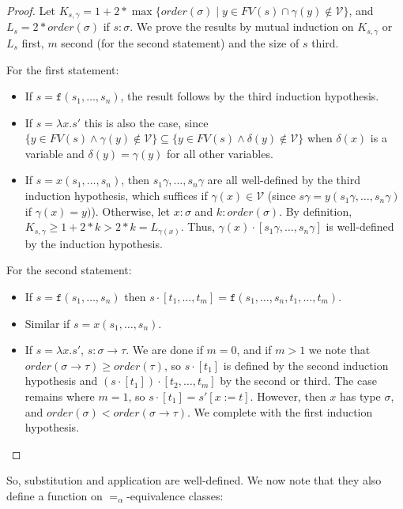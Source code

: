 \documentclass{lmcs}
\theoremstyle{theorem}\newtheorem{theorem}{Theorem}
\theoremstyle{theorem}\newtheorem{lemma}[theorem]{Lemma}
\theoremstyle{theorem}\newtheorem{corollary}[theorem]{Corollary}
\theoremstyle{definition}\newtheorem{definition}[theorem]{Definition}
\theoremstyle{definition}\newtheorem{example}[theorem]{Example}
\newcommand{\V}{\mathcal{V}}
\newcommand{\FV}{\mathit{FV}}
\newcommand{\order}{\mathit{order}}
\newcommand{\atype}{\sigma}
\newcommand{\btype}{\tau}
\newcommand{\identifier}[1]{\mathtt{#1}}
\newcommand{\afun}{\identifier{f}}
\newcommand{\avar}{x}
\newcommand{\bvar}{y}
\newcommand{\abs}[2]{\lambda #1.#2}
\newcommand{\arrtype}{\rightarrow}
\begin{document}
\begin{proof}
Let $K_{s,\gamma} = 1 + 2 * \max\{ \order(\atype) \mid \bvar \in \FV(s) \cap \gamma(\bvar) \notin
\V \}$, and $L_s = 2 * \order(\atype)$ if $s : \atype$.  We prove the results by mutual induction
on $K_{s,\gamma}$ or $L_s$ first, $m$ second (for the second statement) and the size of $s$ third.

For the first statement:
\begin{itemize}
\item If $s = \afun(s_1,\dots,s_n)$, the result follows by the third induction hypothesis.
\item If $s = \abs{\avar}{s'}$ this is also the case, since $\{ \bvar \in \FV(s) \wedge
  \gamma(\bvar) \notin \V \} \subseteq \{ \bvar \in \FV(s) \wedge \delta(\bvar) \notin \V
  \}$ when $\delta(\avar)$ is a variable and $\delta(\bvar) = \gamma(\bvar)$ for all other
  variables.
\item If $s = \avar(s_1,\dots,s_n)$, then $s_1\gamma,\dots,s_n\gamma$ are all well-defined by
  the third induction hypothesis, which suffices if $\gamma(\avar) \in \V$ (since
  $s\gamma = \bvar(s_1\gamma,\dots,s_n\gamma)$ if $\gamma(\avar) = \bvar)$).
  Otherwise, let $\avar : \atype$ and $k : \order(\atype)$.  By definition, $K_{s,\gamma} \geq 1 +
  2 * k > 2 * k = L_{\gamma(\avar)}$.  Thus, $\gamma(\avar) \cdot [s_1\gamma,\dots,s_n\gamma]$
  is well-defined by the induction hypothesis.
\end{itemize}
For the second statement:
\begin{itemize}
\item If $s = \afun(s_1,\dots,s_n)$ then $s \cdot [t_1,\dots,t_m] = \afun(s_1,\dots,s_n,t_1,\dots,
  t_m)$.
\item Similar if $s = \avar(s_1,\dots,s_n)$.
\item If $s = \abs{\avar}{s'}$, $s : \atype \arrtype \btype$. We are done if $m = 0$, and if
  $m > 1$ we note that $\order(\atype \arrtype \btype) \geq \order(\btype)$, so $s \cdot [t_1]$ is
  defined by the second induction hypothesis and $(s \cdot [t_1]) \cdot [t_2,\dots,t_m]$ by the
  second or third.  The case remains where $m = 1$, so $s \cdot [t_1] = s'[\avar:=t]$.  However,
  then $\avar$ has type $\atype$, and $\order(\atype) < \order(\atype \arrtype \btype)$.  We
  complete with the first induction hypothesis.
  \qedhere
\end{itemize}
\end{proof}

So, substitution and application are well-defined.  We now note that they also define a function on
$=_\alpha$-equivalence classes:
\end{document}

